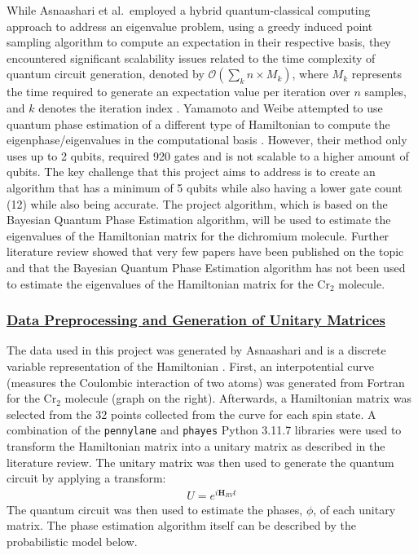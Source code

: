 \documentclass[
]{article}
\begin{document}
While Asnaashari et al.~employed a hybrid quantum-classical computing
approach to address an eigenvalue problem, using a greedy induced point
sampling algorithm to compute an expectation in their respective basis,
they encountered significant scalability issues related to the time
complexity of quantum circuit generation, denoted by
\(\mathcal{O}(\sum_k n \times M_k )\), where \(M_k\) represents the time
required to generate an expectation value per iteration over \(n\)
samples, and \(k\) denotes the iteration index
\cite{asnaashari2023compact}. Yamamoto and Weibe attempted to use
quantum phase estimation of a different type of Hamiltonian to compute
the eigenphase/eigenvalues in the computational basis
\cite{Yamamoto2023, Weibe2016}. However, their method only uses up to 2
qubits, required 920 gates and is not scalable to a higher amount of
qubits. The key challenge that this project aims to address is to create
an algorithm that has a minimum of 5 qubits while also having a lower
gate count (12) while also being accurate. The project algorithm, which
is based on the Bayesian Quantum Phase Estimation algorithm, will be
used to estimate the eigenvalues of the Hamiltonian matrix for the
dichromium molecule. Further literature review showed that very few
papers have been published on the topic and that the Bayesian Quantum
Phase Estimation algorithm has not been used to estimate the eigenvalues
of the Hamiltonian matrix for the Cr\(_2\) molecule.

\vspace{-0.5cm}

\subsubsection*{\texorpdfstring{\underline{Data Preprocessing and Generation of Unitary Matrices}}{}}\label{section-3}

\vspace{-0.5cm}

The data used in this project was generated by Asnaashari and is a
discrete variable representation of the Hamiltonian
\cite{asnaashari2023compact}. First, an interpotential curve (measures
the Coulombic interaction of two atoms) was generated from Fortran for
the Cr\(_2\) molecule (graph on the right). Afterwards, a Hamiltonian
matrix was selected from the 32 points collected from the curve for each
spin state. A combination of the \texttt{pennylane} and \texttt{phayes}
Python 3.11.7 libraries were used to transform the Hamiltonian matrix
into a unitary matrix as described in the literature review. The unitary
matrix was then used to generate the quantum circuit by applying a
transform: \begin{align}
    U = e^{i \mathbf{H}_{RV} t} 
\end{align} The quantum circuit was then used to estimate the phases,
\(\phi\), of each unitary matrix. The phase estimation algorithm itself
can be described by the probabilistic model below. \vspace{-0.5cm}
\end{document}
